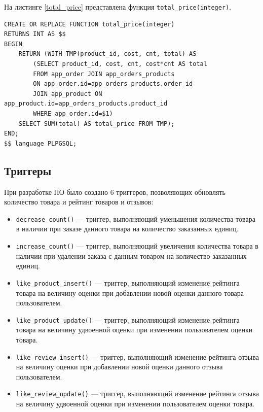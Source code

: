 На листинге \ref{total_price} представлена функция \verb;total_price(integer);.

\newpage

\captionsetup{singlelinecheck = false, justification=raggedright}
\begin{lstlisting}[label=total_price,caption=Функция получения общей суммы заказа по его id]
CREATE OR REPLACE FUNCTION total_price(integer)
RETURNS INT AS $$
BEGIN
    RETURN (WITH TMP(product_id, cost, cnt, total) AS 
        (SELECT product_id, cost, cnt, cost*cnt AS total
		FROM app_order JOIN app_orders_products 
        ON app_order.id=app_orders_products.order_id
        JOIN app_product ON app_product.id=app_orders_products.product_id 
        WHERE app_order.id=$1)
    SELECT SUM(total) AS total_price FROM TMP);
END;
$$ language PLPGSQL;
\end{lstlisting}

\subsection{Триггеры}

При разработке ПО было создано 6 триггеров, позволяющих обновлять количество товара и рейтинг товаров и отзывов:

\begin{itemize}
	\item \verb;decrease_count(); --- триггер, выполняющий уменьшения количества товара в наличии при заказе данного товара на количество заказанных единиц.
	\item \verb;increase_count(); --- триггер, выполняющий увеличения количества товара в наличии при удалении заказа с данным товаром на количество заказанных единиц.
	\item \verb;like_product_insert(); --- триггер, выполняющий изменение рейтинга товара на величину оценки при добавлении новой оценки данного товара пользователем.
	\item \verb;like_product_update(); --- триггер, выполняющий изменение рейтинга товара на величину удвоенной оценки при изменении пользователем оценки товара.
	\item \verb;like_review_insert(); --- триггер, выполняющий изменение рейтинга отзыва на величину оценки при добавлении новой оценки данного отзыва пользователем.
	\item \verb;like_review_update(); --- триггер, выполняющий изменение рейтинга отзыва на величину удвоенной оценки при изменении пользователем оценки товара.
\end{itemize}

